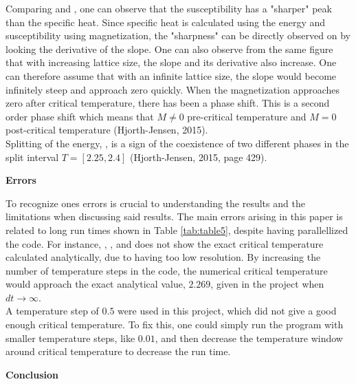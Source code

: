 \documentclass[10pt,a4paper]{article}
\begin{document}
\noindent Comparing  and , one can observe that the susceptibility has a "sharper" peak than the specific heat. Since specific heat is calculated using the energy and susceptibility using magnetization, the "sharpness" can be directly observed on  by looking the derivative of the slope. One can also observe from the same figure that with increasing lattice size, the slope and its derivative also increase. One can therefore assume that with an infinite lattice size, the slope would become infinitely steep and approach zero quickly. When the magnetization approaches zero after critical temperature, there has been a phase shift. This is a second order phase shift which means that $M \neq 0$ pre-critical temperature and $M = 0$ post-critical temperature (Hjorth-Jensen, 2015).\\

\noindent Splitting of the energy, , is a sign of the coexistence of two different phases in the split interval $T = [2.25, 2.4]$ (Hjorth-Jensen, 2015, page 429). \\


\begin{center}
{\LARGE\bf Errors}
\end{center}

\noindent To recognize ones errors is crucial to understanding the results and the limitations when discussing said results. The main errors arising in this paper is related to long run times shown in Table \ref{tab:table5}, despite having parallellized the code. For instance, , ,  and  does not show the exact critical temperature calculated analytically, due to having too low resolution. By increasing the number of temperature steps in the code, the numerical critical temperature would approach the exact analytical value, $2.269$, given in the project when $dt \rightarrow \infty$.\\

\noindent A temperature step of $0.5$ were used in this project, which did not give a good enough critical temperature. To fix this, one could simply run the program with smaller temperature steps, like $0.01$, and then decrease the temperature window around critical temperature to decrease the run time.

\begin{center}
{\LARGE\bf Conclusion}
\end{center}
\end{document}
